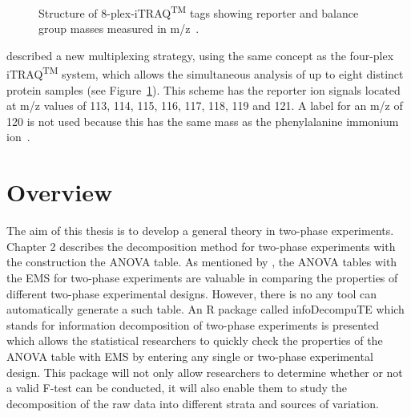 \documentclass[11pt,a4paper]{article}
\begin{document}
\begin{figure}[htb]
\caption{Structure of 8-plex-iTRAQ\textsuperscript{TM} tags showing reporter and balance group masses measured in m/z~\citep{Choe2007}.}
\label{fig:8-plex}
\end{figure}

\cite{Choe2007} described a new multiplexing strategy, using the same concept as the four-plex iTRAQ\textsuperscript{TM} system, which allows the simultaneous analysis of up to eight distinct protein samples (see Figure~\ref{fig:8-plex}). This scheme has the reporter ion signals located at m/z values of 113, 114, 115, 116, 117, 118, 119 and 121. A label for an m/z of 120 is not used because this has the same mass as the phenylalanine immonium ion~\citep{Pierce2008}.   

\section{Overview}
The aim of this thesis is to develop a general theory in two-phase experiments. Chapter 2 describes the decomposition method for two-phase experiments with the construction the ANOVA table. As mentioned by \cite{Brien2011}, the ANOVA tables with the EMS for two-phase experiments are valuable in comparing the properties of different two-phase experimental designs. However, there is no any tool can automatically generate a such table. An R package called infoDecompuTE which stands for information decomposition of two-phase experiments is presented which allows the statistical researchers to quickly check the properties of the ANOVA table with EMS by entering any single or two-phase experimental design. This package will not only allow researchers to determine whether or not a valid F-test can be conducted, it will also enable them to study the decomposition of the raw data into different strata and sources of variation.
\end{document}
